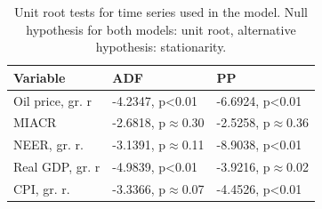 \documentclass[12pt, a4paper]{extarticle}
\begin{document}
\begin{table}[h!]
	\centering
		\begin{tabular}{@{}lll@{}}
			 \toprule
			Variable & ADF & PP \\
			\midrule
			Oil price, gr. r     & {-4.2347, p\textless{}0.01} &{-6.6924, p\textless{}0.01}   \\
			MIACR                & {-2.6818, p$\approx$0.30}          & {-2.5258, p$\approx$0.36}          \\
			NEER, gr. r.         & {-3.1391, p$\approx$0.11} & {-8.9038, p\textless{}0.01}   \\
			Real GDP, gr. r  & {-4.9839, p\textless{}0.01} & {-3.9216, p$\approx$0.02} \\
			CPI, gr. r.          & {-3.3366, p$\approx$0.07}         & {-4.4526, p\textless{}0.01}\\
			\bottomrule
		\end{tabular}%
	\caption{Unit root tests for time series used in the model. Null hypothesis for both models: unit root, alternative hypothesis: stationarity.}
	\label{table:unit_roots}
\end{table}
\end{document}
